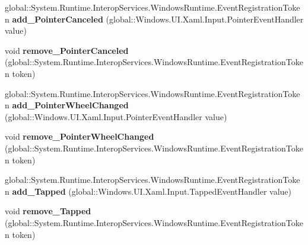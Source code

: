 \begin{DoxyCompactItemize}
\mbox{\label{interface_windows_1_1_u_i_1_1_xaml_1_1_i_u_i_element_aece41d38eee31db31fcc9ce4940bc61d}} 
global\+::\+System.\+Runtime.\+Interop\+Services.\+Windows\+Runtime.\+Event\+Registration\+Token {\bfseries add\+\_\+\+Pointer\+Canceled} (global\+::\+Windows.\+U\+I.\+Xaml.\+Input.\+Pointer\+Event\+Handler value)
\item 
\mbox{\label{interface_windows_1_1_u_i_1_1_xaml_1_1_i_u_i_element_ac9b592ea4f90c7a92f1def7811d1d96f}} 
void {\bfseries remove\+\_\+\+Pointer\+Canceled} (global\+::\+System.\+Runtime.\+Interop\+Services.\+Windows\+Runtime.\+Event\+Registration\+Token token)
\item 
\mbox{\label{interface_windows_1_1_u_i_1_1_xaml_1_1_i_u_i_element_a2716b15da4333bb063c9bc09c373340f}} 
global\+::\+System.\+Runtime.\+Interop\+Services.\+Windows\+Runtime.\+Event\+Registration\+Token {\bfseries add\+\_\+\+Pointer\+Wheel\+Changed} (global\+::\+Windows.\+U\+I.\+Xaml.\+Input.\+Pointer\+Event\+Handler value)
\item 
\mbox{\label{interface_windows_1_1_u_i_1_1_xaml_1_1_i_u_i_element_abfc60dbc7d299bf2692903f393ed810f}} 
void {\bfseries remove\+\_\+\+Pointer\+Wheel\+Changed} (global\+::\+System.\+Runtime.\+Interop\+Services.\+Windows\+Runtime.\+Event\+Registration\+Token token)
\item 
\mbox{\label{interface_windows_1_1_u_i_1_1_xaml_1_1_i_u_i_element_a991022bdcf7af68dd9c2bf3964b3bb14}} 
global\+::\+System.\+Runtime.\+Interop\+Services.\+Windows\+Runtime.\+Event\+Registration\+Token {\bfseries add\+\_\+\+Tapped} (global\+::\+Windows.\+U\+I.\+Xaml.\+Input.\+Tapped\+Event\+Handler value)
\item 
\mbox{\label{interface_windows_1_1_u_i_1_1_xaml_1_1_i_u_i_element_a10d8b2df3301a8687ac2a02dbf56e6ad}} 
void {\bfseries remove\+\_\+\+Tapped} (global\+::\+System.\+Runtime.\+Interop\+Services.\+Windows\+Runtime.\+Event\+Registration\+Token token)
\item 
\mbox{\label{interface_windows_1_1_u_i_1_1_xaml_1_1_i_u_i_element_a236a917ea08d09ceea39e12f03cbe17f}} 

\end{DoxyCompactItemize}
